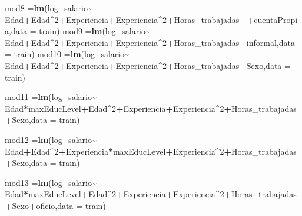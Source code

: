 \documentclass[
]{article}
\newenvironment{Shaded}{\begin{snugshade}}{\end{snugshade}}
\newcommand{\AttributeTok}[1]{\textcolor[rgb]{0.13,0.29,0.53}{#1}}
\newcommand{\DecValTok}[1]{\textcolor[rgb]{0.00,0.00,0.81}{#1}}
\newcommand{\FunctionTok}[1]{\textcolor[rgb]{0.13,0.29,0.53}{\textbf{#1}}}
\newcommand{\NormalTok}[1]{#1}
\newcommand{\OtherTok}[1]{\textcolor[rgb]{0.56,0.35,0.01}{#1}}
\newcommand{\SpecialCharTok}[1]{\textcolor[rgb]{0.81,0.36,0.00}{\textbf{#1}}}
\begin{document}
\begin{Shaded}
\begin{Highlighting}[]
\NormalTok{mod8 }\OtherTok{=}\FunctionTok{lm}\NormalTok{(log\_salario}\SpecialCharTok{\textasciitilde{}}\NormalTok{ Edad}\SpecialCharTok{+}\NormalTok{Edad}\SpecialCharTok{\^{}}\DecValTok{2}\SpecialCharTok{+}\NormalTok{Experiencia}\SpecialCharTok{+}\NormalTok{Experiencia}\SpecialCharTok{\^{}}\DecValTok{2}\SpecialCharTok{+}\NormalTok{Horas\_trabajadas}\SpecialCharTok{++}\NormalTok{cuentaPropia,}\AttributeTok{data =}\NormalTok{ train)}
\NormalTok{mod9 }\OtherTok{=}\FunctionTok{lm}\NormalTok{(log\_salario}\SpecialCharTok{\textasciitilde{}}\NormalTok{ Edad}\SpecialCharTok{+}\NormalTok{Edad}\SpecialCharTok{\^{}}\DecValTok{2}\SpecialCharTok{+}\NormalTok{Experiencia}\SpecialCharTok{+}\NormalTok{Experiencia}\SpecialCharTok{\^{}}\DecValTok{2}\SpecialCharTok{+}\NormalTok{Horas\_trabajadas}\SpecialCharTok{+}\NormalTok{informal,}\AttributeTok{data =}\NormalTok{ train)}
\NormalTok{mod10 }\OtherTok{=}\FunctionTok{lm}\NormalTok{(log\_salario}\SpecialCharTok{\textasciitilde{}}\NormalTok{ Edad}\SpecialCharTok{+}\NormalTok{Edad}\SpecialCharTok{\^{}}\DecValTok{2}\SpecialCharTok{+}\NormalTok{Experiencia}\SpecialCharTok{+}\NormalTok{Experiencia}\SpecialCharTok{\^{}}\DecValTok{2}\SpecialCharTok{+}\NormalTok{Horas\_trabajadas}\SpecialCharTok{+}\NormalTok{Sexo,}\AttributeTok{data =}\NormalTok{ train)}

\NormalTok{mod11 }\OtherTok{=}\FunctionTok{lm}\NormalTok{(log\_salario}\SpecialCharTok{\textasciitilde{}}\NormalTok{ Edad}\SpecialCharTok{*}\NormalTok{maxEducLevel}\SpecialCharTok{+}\NormalTok{Edad}\SpecialCharTok{\^{}}\DecValTok{2}\SpecialCharTok{+}\NormalTok{Experiencia}\SpecialCharTok{+}\NormalTok{Experiencia}\SpecialCharTok{\^{}}\DecValTok{2}\SpecialCharTok{+}\NormalTok{Horas\_trabajadas}\SpecialCharTok{+}\NormalTok{Sexo,}\AttributeTok{data =}\NormalTok{ train)}

\NormalTok{mod12 }\OtherTok{=}\FunctionTok{lm}\NormalTok{(log\_salario}\SpecialCharTok{\textasciitilde{}}\NormalTok{ Edad}\SpecialCharTok{+}\NormalTok{Edad}\SpecialCharTok{\^{}}\DecValTok{2}\SpecialCharTok{+}\NormalTok{Experiencia}\SpecialCharTok{*}\NormalTok{maxEducLevel}\SpecialCharTok{+}\NormalTok{Experiencia}\SpecialCharTok{\^{}}\DecValTok{2}\SpecialCharTok{+}\NormalTok{Horas\_trabajadas}\SpecialCharTok{+}\NormalTok{Sexo,}\AttributeTok{data =}\NormalTok{ train)}

\NormalTok{mod13 }\OtherTok{=}\FunctionTok{lm}\NormalTok{(log\_salario}\SpecialCharTok{\textasciitilde{}}\NormalTok{ Edad}\SpecialCharTok{*}\NormalTok{maxEducLevel}\SpecialCharTok{+}\NormalTok{Edad}\SpecialCharTok{\^{}}\DecValTok{2}\SpecialCharTok{+}\NormalTok{Experiencia}\SpecialCharTok{+}\NormalTok{Experiencia}\SpecialCharTok{\^{}}\DecValTok{2}\SpecialCharTok{+}\NormalTok{Horas\_trabajadas}\SpecialCharTok{+}\NormalTok{Sexo}\SpecialCharTok{+}\NormalTok{oficio,}\AttributeTok{data =}\NormalTok{ train)}


\end{Highlighting}
\end{Shaded}
\end{document}

